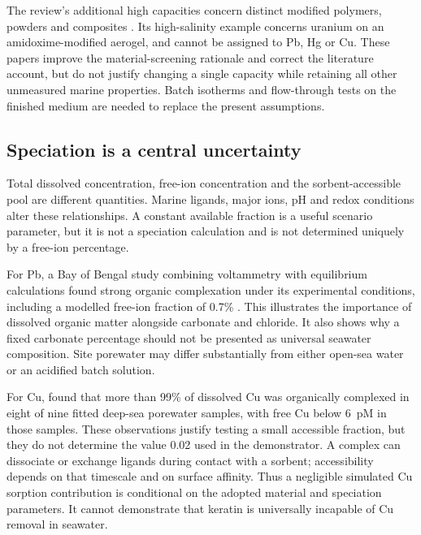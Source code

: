 The review's additional high capacities concern distinct modified polymers, powders and composites \citep{zubair2026}. Its high-salinity example concerns uranium on an amidoxime-modified aerogel, and cannot be assigned to Pb, Hg or Cu. These papers improve the material-screening rationale and correct the literature account, but do not justify changing a single capacity while retaining all other unmeasured marine properties. Batch isotherms and flow-through tests on the finished medium are needed to replace the present assumptions.

\subsection{Speciation is a central uncertainty}

Total dissolved concentration, free-ion concentration and the sorbent-accessible pool are different quantities. Marine ligands, major ions, pH and redox conditions alter these relationships. A constant available fraction is a useful scenario parameter, but it is not a speciation calculation and is not determined uniquely by a free-ion percentage.

For Pb, a Bay of Bengal study combining voltammetry with equilibrium calculations found strong organic complexation under its experimental conditions, including a modelled free-ion fraction of 0.7\% \citep{nabi2025}. This illustrates the importance of dissolved organic matter alongside carbonate and chloride. It also shows why a fixed carbonate percentage should not be presented as universal seawater composition. Site porewater may differ substantially from either open-sea water or an acidified batch solution.

For Cu, \citet{paul2021} found that more than 99\% of dissolved Cu was organically complexed in eight of nine fitted deep-sea porewater samples, with free Cu below 6~pM in those samples. These observations justify testing a small accessible fraction, but they do not determine the value 0.02 used in the demonstrator. A complex can dissociate or exchange ligands during contact with a sorbent; accessibility depends on that timescale and on surface affinity. Thus a negligible simulated Cu sorption contribution is conditional on the adopted material and speciation parameters. It cannot demonstrate that keratin is universally incapable of Cu removal in seawater.

